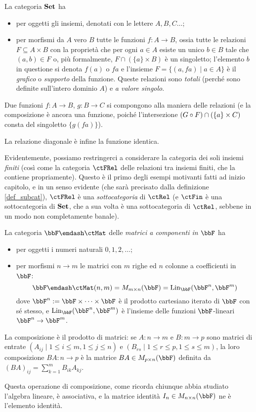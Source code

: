 \begin{example}\label{ex_cat_insiemi}
	La categoria \(\mathbf{Set}\) ha
	\begin{itemize}
		\item per oggetti gli insiemi, denotati con le lettere \(A,B,C\dots\);
		\item per morfismi da \(A\) vero \(B\) tutte le funzioni \(f : A\to B\), ossia tutte le relazioni \(F\subseteq A\times B\) con la proprietà che per ogni \(a\in A\) esiste un unico \(b\in B\) tale che \((a,b)\in F\) o, più formalmente, \(F\cap(\{a\}\times B)\) è un singoletto; l'elemento \(b\) in questione si denota \(f(a)\) o \(fa\) e l'insieme \(F = \{(a,fa)\mid a\in A\}\) è il \emph{grafico} o \emph{supporto} della funzione. Queste relazioni sono \emph{totali} (perché sono definite sull'intero dominio \(A\)) e \emph{a valore singolo}.
	\end{itemize}
	Due funzioni \(f : A\to B\), \(g : B\to C\) si compongono alla maniera delle relazioni (e la composizione è ancora una funzione, poiché l'intersezione \((G\circ F)\cap (\{a\}\times C)\) consta del singoletto \(\{g(fa)\}\)).

	La relazione diagonale è infine la funzione identica.
\end{example}
Evidentemente, possiamo restringerci a considerare la categoria dei soli insiemi \emph{finiti} (così come la categoria \(\ctFRel\) delle relazioni tra insiemi finiti, che la contiene propriamente). Questo è il primo degli esempi motivanti fatti ad inizio capitolo, e in un senso evidente (che sarà precisato dalla definizione \ref{def_subcat}), \(\ctFRel\) è una \emph{sottocategoria} di \(\ctRel\) (e \(\ctFin\) è una sottocategoria di \(\mathbf{Set}\), che a sua volta è una sottocategoria di \(\ctRel\), sebbene in un modo non completamente banale).
\begin{example}\label{ex_cat_matrici}
	La categoria \(\bbF\emdash\ctMat\) delle \emph{matrici a componenti in \(\bbF\)} ha
	\begin{itemize}
		\item per oggetti i numeri naturali \(0,1,2,\dots\);
		\item per morfismi \(n\to m\) le matrici con \(m\) righe ed \(n\) colonne a coefficienti in \(\bbF\):
		      \[\bbF\emdash\ctMat(n,m) = M_{m\times n}(\bbF) = \text{Lin}_{\bbF}(\bbF^n,\bbF^m)\]
		      dove \(\bbF^n:=\bbF \times\dots\times\bbF\) è il prodotto cartesiano iterato di \(\bbF\) con sé stesso, e \(\text{Lin}_{\bbF}(\bbF^n,\bbF^m)\) è l'insieme delle funzioni \(\bbF\)-lineari \(\bbF^n\to\bbF^m\).
	\end{itemize}
	La composizione è il prodotto di matrici: se \(A : n\to m\) e \(B : m\to p\) sono matrici di entrate \((A_{ij}\mid 1\le i\le m,1\le j\le n)\) e \((B_{rs}\mid 1\le r\le p,1\le s\le m)\), la loro composizione \(BA : n\to p\) è la matrice \(BA\in M_{p\times n}(\bbF)\) definita da \((BA)_{ij} = \sum_{k=1}^m B_{ik}A_{kj}\).

	Questa operazione di composizione, come ricorda chiunque abbia studiato l'algebra lineare, è associativa, e la matrice identità \(I_n\in M_{n\times n}(\bbF)\) ne è l'elemento identità.
\end{example}
